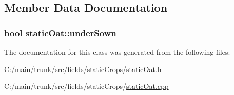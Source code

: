 \subsection{Member Data Documentation}
\hypertarget{classstatic_oat_a09face4bc9d635b749592908aab7b5a8}{
\subsubsection[{underSown}]{\setlength{\rightskip}{0pt plus 5cm}bool {\bf staticOat::underSown}}}
\label{classstatic_oat_a09face4bc9d635b749592908aab7b5a8}


The documentation for this class was generated from the following files:\begin{DoxyCompactItemize}
\item 
C:/main/trunk/src/fields/staticCrops/\hyperlink{static_oat_8h}{staticOat.h}\item 
C:/main/trunk/src/fields/staticCrops/\hyperlink{static_oat_8cpp}{staticOat.cpp}\end{DoxyCompactItemize}
